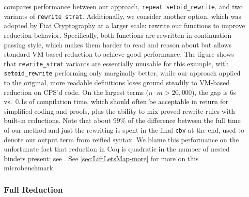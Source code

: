 compares performance between our approach, \texttt{repeat setoid\_rewrite}, and two variants of \texttt{rewrite\_strat}.
Additionally, we consider another option, which was adopted by Fiat Cryptography at a larger scale: rewrite our functions to improve reduction behavior.
Specifically, both functions are rewritten in continuation-passing style, which makes them harder to read and reason about but allows standard VM-based reduction to achieve good performance.
The figure shows that \texttt{rewrite\_strat} variants are essentially unusable for this example, with \texttt{setoid\_rewrite} performing only marginally better, while our approach applied to the original, more readable definitions loses ground steadily to VM-based reduction on CPS'd code.
On the largest terms ($n \cdot m > 20,000$), the gap is 6s vs.\ 0.1s of compilation time, which should often be acceptable in return for simplified coding and proofs, plus the ability to mix proved rewrite rules with built-in reductions.
Note that about 99\% of the difference between the full time of our method and just the rewriting is spent in the final \texttt{cbv} at the end, used to denote our output term from reified syntax.
We blame this performance on the unfortunate fact that reduction in Coq is quadratic in the number of nested binders present; see .
See \autoref{sec:LiftLetsMap-more} for more on this microbenchmark.

\bgroup
{}
\subsubsection{Full Reduction}\label{sec:micro:Eratosthenes}

